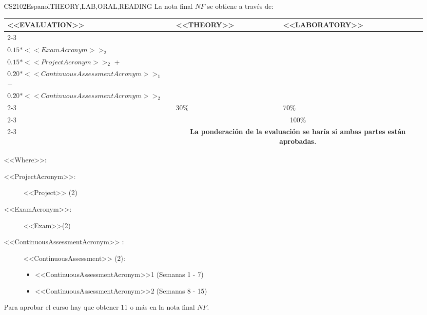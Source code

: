   \begin{evaluation}{CS2102}{Espanol}{THEORY,LAB,ORAL,READING}
  La nota final $NF$ se obtiene a través de:
 
  \begin{tabularx}{0.9\textwidth}{|X|p{}|p{}|} \hline
  \multirow{4}{*}{\uppercase{<<Evaluation>>}} & \uppercase{<<Theory>>} & \uppercase{<<Laboratory>>} \\ \cline{2-3}
  & %
      \begin{minipage}{0.95\textwidth}
      \begin{tabular}{l}
          $0.15*<<ExamAcronym>>_{1}$ + \\  
          $0.15*<<ExamAcronym>>_{2}$  
      \end{tabular} 
      \end{minipage} 
  & %
      \begin{minipage}{0.95\textwidth}
      \begin{tabular}{l}
          $0.15*<<ProjectAcronym>>_{1}$ + \\
          $0.15*<<ProjectAcronym>>_{2}$ + \\
          $0.20*<<ContinuousAssessmentAcronym>>_{1}$ + \\
          $0.20*<<ContinuousAssessmentAcronym>>_{2}$
          \end{tabular} 
      \end{minipage}                 \\ \cline{2-3}
  
  & %
  30\% 
  & %
  70\% \\ \cline{2-3}
  & \multicolumn{2}{c|}{100\%}  \\ \cline{2-3}
  & \multicolumn{2}{c|}{\textbf{La ponderación de la evaluación se haría si ambas partes están aprobadas.}}  \\ \hline
  \end{tabularx}
  
  \vspace{2mm}
  \noindent <<Where>>:
  \begin{description}
    \item[<<ProjectAcronym>>:] <<Project>> (2)   
    \item[<<ExamAcronym>>:] <<Exam>>(2) 
    \item[<<ContinuousAssessmentAcronym>> :] <<ContinuousAssessment>> (2):
        \begin{itemize}
              \item  <<ContinuousAssessmentAcronym>>1 (Semanas 1 - 7)
              \item <<ContinuousAssessmentAcronym>>2 (Semanas 8 - 15)
        \end{itemize}
  \end{description}
  
  \noindent Para aprobar el curso hay que obtener 11 o más en la nota final $NF$.
  \end{evaluation}
 

